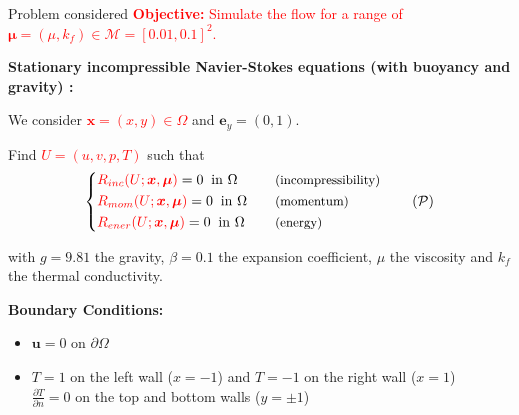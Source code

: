 \begin{frame}[noframenumbering]{Problem considered}
	\textcolor{red}{\textbf{Objective:} Simulate the flow for a range of $\bm{\mu} = (\mu,k_f) \in \mathcal{M} = [0.01, 0.1]^2$.}
	
	\vspace{5pt}
	\textbf{Stationary incompressible Navier-Stokes equations (with buoyancy and gravity) :}

	We consider \textcolor{red}{$\bm{x}=(x,y)\in\Omega$} and $\mathbf{e}_y = (0,1)$.
	
	Find \textcolor{red}{$U = (u,v,p,T)$} such that
	\begin{equation}
		\left\{\begin{aligned}
			&\textcolor{red}{R_{inc}(U;\bm{x},\bm{\mu})} = 0 \;\; \text{in } \Omega \quad &&\text{\small (incompressibility)} \\
			&\textcolor{red}{R_{mom}(U;\bm{x},\bm{\mu})} = 0 \;\; \text{in } \Omega \quad &&\text{\small (momentum)} \\
			&\textcolor{red}{R_{ener}(U;\bm{x},\bm{\mu})} = 0 \;\; \text{in } \Omega \quad &&\text{\small (energy)}
		\end{aligned}\right.
		\tag{$\mathcal{P}$}
	\end{equation}
	
	with $g=9.81$ the gravity, $\beta=0.1$ the expansion coefficient, $\mu$ the viscosity and $k_f$ the thermal conductivity. \citep{coulaud_investigations_2024}

	\vspace{5pt}
	\textbf{Boundary Conditions:} 

	\begin{itemize}
		\item $\mathbf{u} = 0$ on $\partial\Omega$
		\item $T = 1$ on the left wall ($x=-1$) and $T = -1$ on the right wall ($x=1$) \\
		$\displaystyle \frac{\partial T}{\partial n} = 0$ on the top and bottom walls ($y=\pm 1$)	
	\end{itemize}

\end{frame}